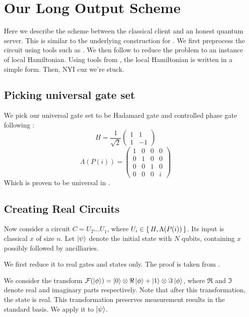 \section{Our Long Output Scheme}

Here we describe the scheme between the classical client and an honest quantum server. This is similar to the underlying construction for \cite{mahadev_delegation}. We first preprocess the circuit using tools such as \cite{quant-ph/0301040}. We then follow \cite{kitaev2002classical} to reduce the problem to an instance of local Hamiltonian. Using tools from \cite{PhysRevA.93.022326}, the local Hamiltonian is written in a simple form. Then, NYI cuz we're stuck.

\subsection{Picking universal gate set}

We pick our universal gate set to be Hadamard gate and controlled phase gate following \cite{quant-ph/0301040}:
$$H=\frac{1}{\sqrt{2}}\begin{pmatrix}1&1\\1&-1\end{pmatrix}$$
$$\Lambda(P(i))=\begin{pmatrix}1&0&0&0\\0&1&0&0\\0&0&1&0\\0&0&0&i\end{pmatrix}$$
Which is proven to be universal in \cite{kitaev_1997}.

\subsection{Creating Real Circuits}

Now consider a circuit $C=U_T\ldots U_1$, where $U_i\in\set{H, \Lambda(P(i))}$. Its input is classical $x$ of size $n$. Let $\ket\psi$ denote the initial state with $N$ qubits, containing $x$ possibly followed by ancilliaries.

We first reduce it to real gates and states only. The proof is taken from \cite{quant-ph/0301040}.

We consider the transform $\mathcal{F}(\ket{\phi})=\ket{0}\otimes\Re\ket{\phi}+\ket{1}\otimes\Im\ket{\phi}$, where $\Re$ and $\Im$ denote real and imaginary parts respectively. Note that after this transformation, the state is real. This transformation preserves measurement results in the standard basis. We apply it to $\ket\psi$.

